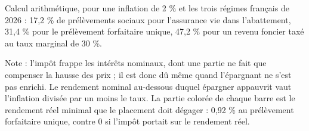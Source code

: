Calcul arithmétique, pour une inflation de 2 \% et les trois régimes français de 2026 : 17,2 \% de prélèvements sociaux pour l'assurance vie dans l'abattement, 31,4 \% pour le prélèvement forfaitaire unique, 47,2 \% pour un revenu foncier taxé au taux marginal de 30 \%.\par Note : l'impôt frappe les intérêts nominaux, dont une partie ne fait que compenser la hausse des prix ; il est donc dû même quand l'épargnant ne s'est pas enrichi. Le rendement nominal au-dessous duquel épargner appauvrit vaut l'inflation divisée par un moins le taux. La partie colorée de chaque barre est le rendement réel minimal que le placement doit dégager : 0,92 \% au prélèvement forfaitaire unique, contre 0 si l'impôt portait sur le rendement réel.
